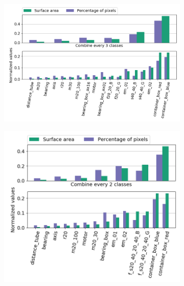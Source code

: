 		\begin{figure}
			\begin{subfigure}{1\textwidth}
				\centering
				\includegraphics[width=1\linewidth]{images/analyzer_full}
				\caption{}
				\label{Fig:analyzera}
			\end{subfigure}
			\begin{subfigure}{.53\textwidth}
				\centering
				\includegraphics[width=1\linewidth]{images/analyzer_size}
				\caption{}
				\label{Fig:analyzerb}
			\end{subfigure}
			\begin{subfigure}{.47\textwidth}
				\centering

\end{subfigure}
\end{figure}
